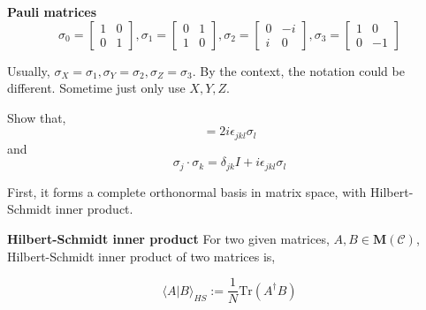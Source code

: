 \begin{definition}\textbf{Pauli matrices}
    \begin{equation}
        \sigma_0 = \begin{bmatrix}
            1 & 0 \\
            0 & 1
        \end{bmatrix},
        \sigma_1 = \begin{bmatrix}
            0 & 1 \\
            1 & 0
        \end{bmatrix},
        \sigma_2 = \begin{bmatrix}
            0 & -i \\
            i & 0
        \end{bmatrix},
        \sigma_3 = \begin{bmatrix}
            1 & 0 \\
            0 & -1
        \end{bmatrix}
    \end{equation}
\end{definition}

Usually, $\sigma_X = \sigma_1, \sigma_Y = \sigma_2, \sigma_Z = \sigma_3$.
By the context, the notation could be different. Sometime just only use $X, Y, Z$.

\begin{exercise}
    Show that, 
    \begin{equation*}
        [\sigma_j, \sigma_k] = 2 i \epsilon_{jkl} \sigma_l
    \end{equation*}
    and
    \begin{equation*}
        \sigma_j \cdot \sigma_k = \delta_{jk} I + i  \epsilon_{jkl} \sigma_l
    \end{equation*}
\end{exercise}

First, it forms a complete orthonormal basis in matrix space,
with Hilbert-Schmidt inner product.

\begin{definition}\textbf{Hilbert-Schmidt inner product}
    For two given matrices, $A, B \in \mathbf{M}(\mathcal{C})$,
    Hilbert-Schmidt inner product of two matrices is,

    \begin{equation}
        \langle A | B \rangle_{HS} := \frac{1}{N}\text{Tr}(A^\dagger B)
    \end{equation}
\end{definition}

